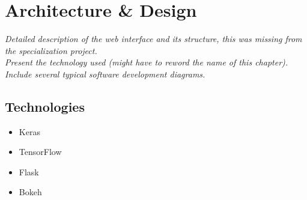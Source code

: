 
\chapter{Architecture \& Design}

\textit{Detailed description of the web interface and its structure, this was missing from the specialization project. \\
\noindent Present the technology used (might have to reword the name of this chapter). \\
\noindent Include several typical software development diagrams.}

\section{Technologies}

\begin{itemize}
    \item Keras
    \item TensorFlow
    \item Flask
    \item Bokeh
\end{itemize}

\cleardoublepage
